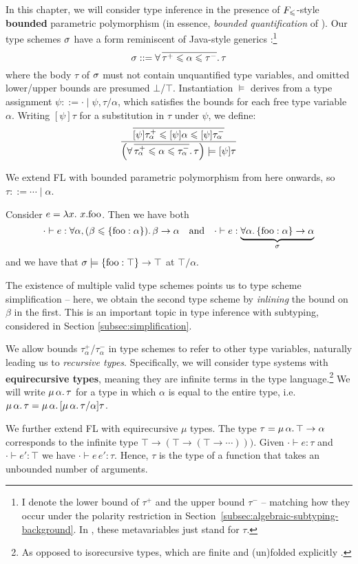 In this chapter, we will consider type inference in the presence of $F_\leqslant$-style \textbf{bounded} parametric polymorphism (in essence, \emph{bounded quantification} of \textcite{bounded-quantification}). Our type schemes $\sigma$ have a form reminiscent of Java-style generics \cite{generic-java, simple-sub}:\footnote{I denote the lower bound of $\tau^+$ and the upper bound $\tau^-$ -- matching how they occur under the polarity restriction in Section~\ref{subsec:algebraic-subtyping-background}. In \inference{}, these metavariables just stand for $\tau$.}
$$ \sigma ::= \forall \, \overline{\tau^+ \leqslant \alpha \leqslant \tau^-} \ldotp \tau $$
where the body $\tau$ of $\sigma$ must not contain unquantified type variables, and omitted lower/upper bounds are presumed $\bot$/$\top$. 
Instantiation $\models$ derives from a type assignment $\psi ::= \cdot \mid \psi, \tau/\alpha$, which satisfies the bounds for each free type variable $\alpha$. Writing $[\psi]\tau$ for a substitution in $\tau$ under $\psi$, we define:
$$ \dfrac{\overline{[\psi]\tau_\alpha^+ \sub \substx{\psi} \alpha \sub [\psi]\tau_\alpha^-}}{\left( \forall\, \overline{\tau_\alpha^+ \sub \alpha \sub \tau_\alpha^-} \ldotp \tau \right) \models \substx{\psi}{\tau}} $$

\begin{example}
    We extend FL with bounded parametric polymorphism from here onwards, so $\tau ::= \cdots \mid \alpha$. 

    Consider $e = \lambda {x} \ldotp\, {x}{.}{\mathrm{foo}}$. Then we have both 
    $$ \cdot \vdash e : \forall \alpha, (\beta \sub \flrec{\mathrm{foo} : \alpha}) \ldotp \beta \to \alpha  \quad \text{and} \quad \cdot \vdash e : \underbrace{\forall \alpha \ldotp \flrec{\mathrm{foo} : \alpha} \to \alpha}_\sigma $$
    and we have that $\sigma \models \flrec{\mathrm{foo} : \top} \to \top$ at $\top/\alpha$.
    
    The existence of multiple valid type schemes points us to type scheme simplification -- here, we obtain the second type scheme by \emph{inlining} the bound on $\beta$ in the first. This is an important topic in type inference with subtyping, considered in Section \ref{subsec:simplification}.
\end{example}

We allow bounds $\tau_\alpha^+$/$\tau_\alpha^-$ in type schemes to refer to other type variables, naturally leading us to \emph{recursive types}.
Specifically, we will consider type systems with \textbf{equirecursive types}, meaning they are infinite terms in the type language.\footnote{As opposed to isorecursive types, which are finite and (un)folded explicitly \cite{tapl}.} We will write $\mu\,{\alpha}\ldotp \tau$ for a type in which $\alpha$ is equal to the entire type, i.e.\@ $\mu\,{\alpha}\ldotp  \tau = \mu\,{\alpha}\ldotp [\mu\,{\alpha}\ldotp \tau/\alpha] \tau$.
\begin{example}
    We further extend FL with equirecursive $\mu$ types. 
    The type $\tau = \mu\,{\alpha}\ldotp \top \to \alpha$ corresponds to the infinite type $\top \to (\top \to (\top \to \cdots)))$. Given $\cdot \vdash e : \tau$ and $\cdot \vdash e' : \top$ we have $\cdot \vdash e\,e' : \tau$. Hence, $\tau$ is the type of a function that takes an unbounded number of arguments.
\end{example}

